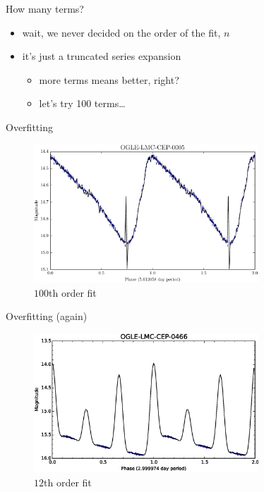 \documentclass{beamer}
\begin{document}
\begin{frame}{How many terms?}
  \begin{itemize}
  \item wait, we never decided on the order of the fit, $n$
  \item it's just a truncated series expansion
    \begin{itemize}
    \item more terms means better, right?
    \item let's try 100 terms\ldots
    \end{itemize}
  \end{itemize}
\end{frame}

\begin{frame}{Overfitting}
  \begin{figure}[h]
    \centering
    \includegraphics[width=0.75\textwidth]{img/fits/OGLE-LMC-CEP-0005-degree100}
    \caption*{$100$th order fit}
  \end{figure}
\end{frame}

\begin{frame}{Overfitting (again)}
  \begin{figure}[h]
    \centering
    \includegraphics[width=0.75\textwidth]{img/lightcurve-overfit}
    \caption*{$12$th order fit}
  \end{figure}
\end{frame}
\end{document}
